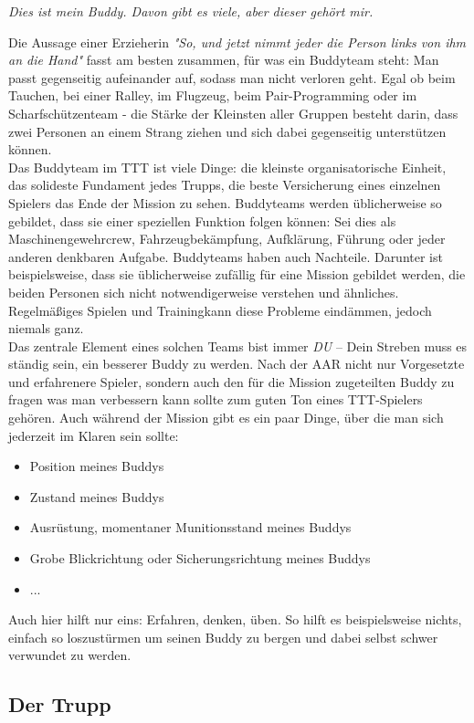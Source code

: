 \centerline{\textit{Dies ist mein Buddy. Davon gibt es viele, aber dieser gehört mir.}}
	Die Aussage einer Erzieherin \textit{"So, und jetzt nimmt jeder die Person links von ihm an die Hand"} fasst am besten zusammen, für was ein Buddyteam steht: Man passt gegenseitig aufeinander auf, sodass man nicht verloren geht. Egal ob beim Tauchen, bei einer Ralley, im Flugzeug, beim Pair-Programming oder im Scharfschützenteam - die Stärke der Kleinsten aller Gruppen besteht darin, dass zwei Personen an einem Strang ziehen und sich dabei gegenseitig unterstützen können. \\
	Das Buddyteam im \ac{TTT} ist viele Dinge: die kleinste organisatorische Einheit, das solideste Fundament jedes Trupps, die beste Versicherung eines einzelnen Spielers das Ende der Mission zu sehen. Buddyteams werden üblicherweise so gebildet, dass sie einer speziellen Funktion folgen können: Sei dies als Maschinengewehrcrew, Fahrzeugbekämpfung, Aufklärung, Führung oder jeder anderen denkbaren Aufgabe. Buddyteams haben auch Nachteile. Darunter ist beispielsweise, dass sie üblicherweise zufällig für eine Mission gebildet werden, die beiden Personen sich nicht notwendigerweise verstehen und ähnliches. Regelmäßiges Spielen und Trainingkann diese Probleme eindämmen, jedoch niemals ganz. \\
	Das zentrale Element eines solchen Teams bist immer \textit{DU} -- Dein Streben muss es ständig sein, ein besserer Buddy zu werden. Nach der AAR nicht nur Vorgesetzte und erfahrenere Spieler, sondern auch den für die Mission zugeteilten Buddy zu fragen was man verbessern kann sollte zum guten Ton eines \ac{TTT}-Spielers gehören. Auch während der Mission gibt es ein paar Dinge, über die man sich jederzeit im Klaren sein sollte:
		\begin{itemize}
			\item Position meines Buddys
			\item Zustand meines Buddys
			\item Ausrüstung, momentaner Munitionsstand meines Buddys
			\item Grobe Blickrichtung oder Sicherungsrichtung meines Buddys
			\item ...
		\end{itemize}
	Auch hier hilft nur eins: Erfahren, denken, üben. So hilft es beispielsweise nichts, einfach so loszustürmen um seinen Buddy zu bergen und dabei selbst schwer verwundet zu werden. 

\subsection{Der Trupp}

